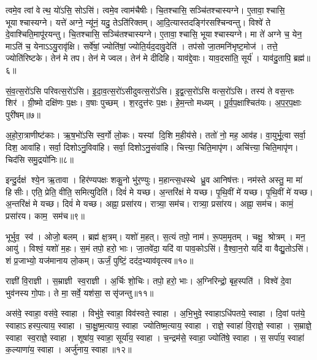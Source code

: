    त्वमे॒व त्वां वेत्थ॒ यो॑ऽसि॒ सोऽसि॑।
   त्वमे॒व त्वाम॑चैषीः।
   चि॒तश्चासि॒ सञ्चि॑तश्चास्यग्ने।
   ए॒तावा॒श्चासि॒ भूयाश्चास्यग्ने।
   यत्ते॑ अग्ने॒ न्यू॑नं॒ यदु॒ तेऽति॑रिक्तम्।
   आ॒दि॒त्यास्तदङ्गि॑रस\-श्चिन्वन्तु।
   विश्वे॑ ते दे॒वाश्चिति॒मापू॑रयन्तु।
   चि॒तश्चासि॒ सञ्चि॑तश्चास्यग्ने।
   ए॒तावा॒श्चासि॒ भूयाश्चास्यग्ने।
   मा ते॑ अग्ने च॒ येन॒ माऽति॑ च॒ येनाऽऽयु॒रावृ॑क्षि।
   सर्वे॑षां॒ ज्योति॑षां॒ ज्योति॒र्यद॒दावु॒देति॑ ।
   तप॑सो जा॒तमनि॑भृष्ट॒मोज॑।
   तत्ते॒ ज्योति॑रिष्टके।
   तेन॑ मे तप।
   तेन॑ मे ज्वल।
   तेन॑ मे दीदिहि।
   याव॑द्दे॒वाः।
   याव॒दसा॑ति॒ सूर्य॑।
   याव॑दु॒तापि॒ ब्रह्म॑॥६॥
\anuvakamend

   सं॒व॒त्स॒रो॑ऽसि परिवत्स॒रो॑\-ऽसि।
   इ॒दा॒व॒त्स॒रो॑ऽसीदुवत्स॒रो॑\-ऽसि।
   इ॒द्व॒त्स॒रो॑ऽसि वत्स॒रो॑\-ऽसि।
   तस्य॑ ते वस॒न्तः शिर॑।
   ग्री॒ष्मो दक्षि॑णः प॒क्षः।
   व॒षाः पुच्छम्।
   श॒रदुत्त॑रः प॒क्षः।
   हे॒म॒न्तो मध्यम्।
   पू॒र्व॒प॒क्षाश्चित॑यः।
   अ॒प॒र॒प॒क्षाः पुरी॑षम्॥७॥

   अ॒हो॒रा॒त्राणीष्ट॑काः।
   ऋ॒ष॒भो॑ऽसि स्व॒र्गो लो॒कः।
   यस्यां दि॒शि म॒हीय॑से।
   ततो॑ नो॒ मह॒ आव॑ह।
   वा॒युर्भू॒त्वा सर्वा॒ दिश॒ आवा॑हि।
   सर्वा॒ दिशोऽनु॒विवा॑हि।
   सर्वा॒ दिशोऽनु॒संवा॑हि।
   चित्त्या॒ चिति॒मापृ॑ण।
   अचि॑त्त्या॒  चिति॒मापृ॑ण।
   चिद॑सि समु॒द्रयो॑निः॥८॥

   इन्दु॒र्दक्ष॑ श्ये॒न ऋ॒तावा।
   हिर॑ण्यपक्षः शकु॒नो भु॑र॒ण्युः।
   म॒हान्त्स॒धस्थे ध्रु॒व आनिष॑त्तः।
   नम॑स्ते अस्तु॒ मा मा॑ हिसीः।
   एति॒ प्रेति॒ वीति॒ समित्युदिति॑।
   दिवं॑ मे यच्छ।
   अ॒न्तरि॑क्षं मे यच्छ।
   पृ॒थि॒वीं मे॑ यच्छ।
   पृ॒थि॒वीं मे॑ यच्छ।
   अ॒न्तरि॑क्षं मे यच्छ।
   दिवं॑ मे यच्छ।
   अह्ना॒ प्रसा॑रय।
   रात्र्या॒ सम॑च।
   रात्र्या॒ प्रसा॑रय।
   अह्ना॒ सम॑च।
   कामं॒ प्रसा॑रय।
   काम॒ सम॑च॥९॥
   \anuvakamend

   भूर्भुव॒ स्व॑।
   ओजो॒ बलम्।
   ब्रह्म॑ क्ष॒त्रम्।
   यशो॑ म॒हत्।
   स॒त्यं तपो॒ नाम॑।
   रू॒पम॒मृतम्।
   चक्षु॒ श्रोत्रम्।
   मन॒ आयु॑।
   विश्वं॒ यशो॑ म॒हः।
   स॒मं तपो॒ हरो॒ भाः।
   जा॒तवे॑दा॒ यदि॑ वा पाव॒कोऽसि॑।
   वै॒श्वा॒न॒रो यदि॑ वा वैद्यु॒तोऽसि॑।
   शं प्र॒जाभ्यो॒ यज॑मानाय लो॒कम्।
   ऊर्जं॒ पुष्टिं॒ दद॑द॒भ्याव॑वृत्स्व॥१०॥
   \anuvakamend

   राज्ञी॑ वि॒राज्ञी।
   स॒म्राज्ञी स्व॒राज्ञी।
   अ॒र्चिः शो॒चिः।
   तपो॒ हरो॒ भाः।
   अ॒ग्निरिन्द्रो॒ बृह॒स्पति॑।
   विश्वे॑ दे॒वा भुव॑नस्य गो॒पाः।
   ते मा॒ सर्वे॒ यश॑सा॒ ससृ॑जन्तु॥११॥
\anuvakamend

   अस॑वे॒ स्वाहा॒ वस॑वे॒ स्वाहा।
   विभु॑वे॒ स्वाहा॒ विव॑स्वते॒ स्वाहा।
   अ॒भि॒भुवे॒ स्वाहाऽधि॑पतये॒ स्वाहा।
   दि॒वां पत॑ये॒ स्वाहाऽहस्प॒त्याय॒ स्वाहा।
   चा॒क्षु॒ष्म॒त्याय॒ स्वाहा ज्योतिष्म॒त्याय॒ स्वाहा।
   राज्ञे॒ स्वाहा॑ वि॒राज्ञे॒ स्वाहा।
   स॒म्राज्ञे॒ स्वाहा स्व॒राज्ञे॒ स्वाहा।
   शूषा॑य॒ स्वाहा॒ सूर्या॑य॒ स्वाहा।
   च॒न्द्रम॑से॒ स्वाहा॒ ज्योति॑षे॒ स्वाहा।
   स॒सर्पा॑य॒ स्वाहा॑ क॒ल्याणा॑य॒ स्वाहा।
   अर्जु॑नाय॒ स्वाहा॥१२॥
\anuvakamend

